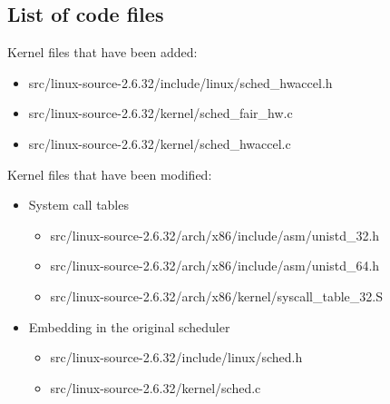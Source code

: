 \subsection{List of code files}
Kernel files that have been added:
\begin{itemize}
   \item src/linux-source-2.6.32/include/linux/sched\_hwaccel.h
   \item src/linux-source-2.6.32/kernel/sched\_fair\_hw.c
   \item src/linux-source-2.6.32/kernel/sched\_hwaccel.c
\end{itemize}
Kernel files that have been modified:
\begin{itemize}
  \item System call tables
	\begin{itemize}
		 \item src/linux-source-2.6.32/arch/x86/include/asm/unistd\_32.h
		 \item src/linux-source-2.6.32/arch/x86/include/asm/unistd\_64.h
		 \item src/linux-source-2.6.32/arch/x86/kernel/syscall\_table\_32.S
	\end{itemize}
	\item Embedding in the original scheduler
	\begin{itemize}
		 \item src/linux-source-2.6.32/include/linux/sched.h
		 \item src/linux-source-2.6.32/kernel/sched.c
	\end{itemize}
\end{itemize}
